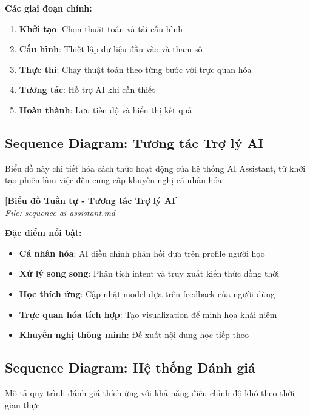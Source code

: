 \textbf{Các giai đoạn chính:}
\begin{enumerate}
    \item \textbf{Khởi tạo}: Chọn thuật toán và tải cấu hình
    \item \textbf{Cấu hình}: Thiết lập dữ liệu đầu vào và tham số
    \item \textbf{Thực thi}: Chạy thuật toán theo từng bước với trực quan hóa
    \item \textbf{Tương tác}: Hỗ trợ AI khi cần thiết
    \item \textbf{Hoàn thành}: Lưu tiến độ và hiển thị kết quả
\end{enumerate}

\subsection{Sequence Diagram: Tương tác Trợ lý AI}
\label{subsec:ai-assistant-sequence}

Biểu đồ này chi tiết hóa cách thức hoạt động của hệ thống AI Assistant, từ khởi tạo phiên làm việc đến cung cấp khuyến nghị cá nhân hóa.

\begin{center}
\textbf{[Biểu đồ Tuần tự - Tương tác Trợ lý AI]}\\
\textit{File: sequence-ai-assistant.md}
\end{center}

\textbf{Đặc điểm nổi bật:}
\begin{itemize}
    \item \textbf{Cá nhân hóa}: AI điều chỉnh phản hồi dựa trên profile người học
    \item \textbf{Xử lý song song}: Phân tích intent và truy xuất kiến thức đồng thời
    \item \textbf{Học thích ứng}: Cập nhật model dựa trên feedback của người dùng
    \item \textbf{Trực quan hóa tích hợp}: Tạo visualization để minh họa khái niệm
    \item \textbf{Khuyến nghị thông minh}: Đề xuất nội dung học tiếp theo
\end{itemize}

\subsection{Sequence Diagram: Hệ thống Đánh giá}
\label{subsec:assessment-sequence}

Mô tả quy trình đánh giá thích ứng với khả năng điều chỉnh độ khó theo thời gian thực.

